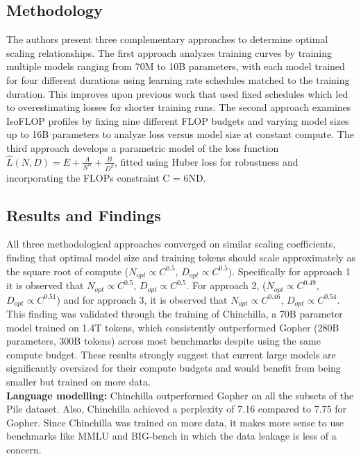 \documentclass{article}
\begin{document}
\subsection{Methodology}
The authors present three complementary approaches to determine optimal scaling relationships. The first approach analyzes training curves by training multiple models ranging from 70M to 10B parameters, with each model trained for four different durations using learning rate schedules matched to the training duration. This improves upon previous work that used fixed schedules which led to overestimating losses for shorter training runs. The second approach examines IsoFLOP profiles by fixing nine different FLOP budgets and varying model sizes up to 16B parameters to analyze loss versus model size at constant compute. The third approach develops a parametric model of the loss function $\hat{L}(N,D) = E + \frac{A}{N^\alpha} + \frac{B}{D^\beta}$, fitted using Huber loss for robustness and incorporating the FLOPs constraint C = 6ND.

\subsection{Results and Findings}
All three methodological approaches converged on similar scaling coefficients, finding that optimal model size and training tokens should scale approximately as the square root of compute ($N_{opt} \propto C^{0.5}$, $D_{opt} \propto C^{0.5}$). Specifically for approach 1 it is observed that $N_{opt} \propto C^{0.5}$, $D_{opt} \propto C^{0.5}$. For approach 2, ($N_{opt} \propto C^{0.49}$, $D_{opt} \propto C^{0.51}$) and for approach 3, it is observed that $N_{opt} \propto C^{0.46}$, $D_{opt} \propto C^{0.54}$.  This finding was validated through the training of Chinchilla, a 70B parameter model trained on 1.4T tokens, which consistently outperformed Gopher (280B parameters, 300B tokens) across most benchmarks despite using the same compute budget. These results strongly suggest that current large models are significantly oversized for their compute budgets and would benefit from being smaller but trained on more data. \\

\noindent \textbf{Language modelling:} Chinchilla outperformed Gopher on all the subsets of the Pile dataset. Also, Chinchilla achieved a perplexity of 7.16 compared to 7.75 for Gopher.
Since Chinchilla was trained on more data, it makes more sense to use benchmarks like MMLU and BIG-bench in which the data leakage is less of a concern. \\
\end{document}
